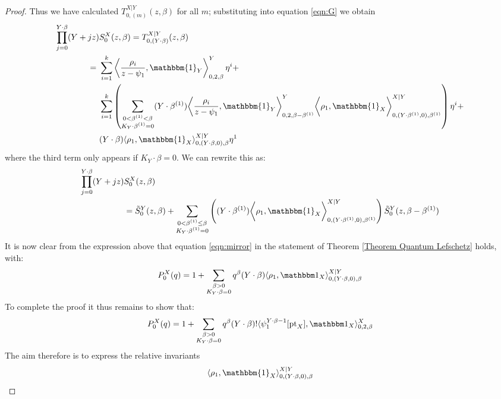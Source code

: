 \begin{proof}
Thus we have calculated $T_{0,(m)}^{X|Y}(z,\beta)$ for all $m$; substituting into equation \eqref{eqn:G} we obtain
\begin{align*} \prod_{j=0}^{Y \cdot \beta} (Y + jz) & S_0^X(z,\beta) = T_{0,(Y\cdot\beta)}^{X|Y}(z,\beta) \\
= \ & \sum_{i=1}^k \left\langle \dfrac{\rho_i}{z-\psi_1}, \mathbbm{1}_Y \right\rangle_{0,2,\beta}^Y \eta^i + \\
& \sum_{i=1}^k \left( \sum_{\substack{0 < \beta^{(1)} < \beta \\ K_Y \cdot \beta^{(1)}=0}} (Y \cdot \beta^{(1)}) \bigg\langle \dfrac{\rho_i}{z-\psi_1}, \mathbbm{1}_Y \bigg\rangle_{0,2,\beta-\beta^{(1)}}^Y \bigg\langle \rho_1, \mathbbm{1}_X \bigg\rangle_{0,(Y \cdot \beta^{(1)},0),\beta^{(1)}}^{X|Y} \right) \eta^i + \\
& (Y \cdot \beta) \langle \rho_1 , \mathbbm{1}_X \rangle_{0,(Y \cdot \beta,0),\beta}^{X|Y} \eta^1
\end{align*}
where the third term only appears if $K_Y \cdot \beta=0$. We can rewrite this as:
\begin{align*} \prod_{j=0}^{Y \cdot \beta} (Y + jz) & S_0^X(z,\beta) \\
& = \tilde{S}_0^Y(z,\beta) + \sum_{\substack{0 < \beta^{(1)} \leq \beta \\ K_Y \cdot \beta^{(1)}=0}} \left( (Y \cdot \beta^{(1)}) \bigg\langle \rho_1, \mathbbm{1}_X \bigg\rangle_{0,(Y \cdot \beta^{(1)},0),\beta^{(1)}}^{X|Y} \right) \tilde{S}_0^Y(z,\beta-\beta^{(1)})
\end{align*}
It is now clear from the expression above that equation \eqref{eqn:mirror} in the statement of Theorem \ref{Theorem Quantum Lefschetz} holds, with:
\begin{equation*} P_0^X(q) = 1 + \sum_{\substack{\beta>0 \\ K_Y\cdot\beta=0}} q^\beta (Y\cdot\beta) \langle \rho_1,\mathbbm 1_{X}\rangle_{0,(Y\cdot\beta,0),\beta}^{X|Y} \end{equation*}
To complete the proof it thus remains to show that:
\begin{equation*} P_0^X(q) = 1 + \sum_{\substack{\beta>0 \\ K_Y\cdot\beta=0}} q^\beta(Y\cdot\beta)!\langle\psi_1^{Y\cdot\beta-1} [\pt_X],\mathbbm 1_{X}\rangle_{0,2,\beta}^X \end{equation*}
The aim therefore is to express the relative invariants
\begin{equation*} \langle \rho_1 , \mathbbm{1}_X \rangle_{0,(Y\cdot\beta,0),\beta}^{X|Y} \end{equation*}

\end{proof}
